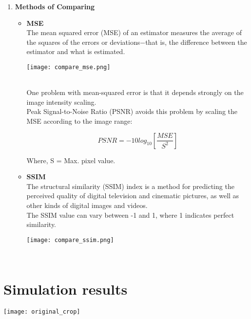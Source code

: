 \documentclass[journal]{IEEEtran}
\begin{document}
\begin{enumerate}
    \item \textbf{Methods of Comparing}\\
    \begin{itemize}
        \item \textbf{MSE}\\
        The mean squared error (MSE) of an estimator measures the average of the squares of the errors or deviations$-$that is, the difference between the estimator and what is estimated.\\
        
        \begin{minipage}{\linewidth}
    		\centering
    		\texttt{[image: compare\_mse.png]}
    	\end{minipage} \\
        
        One problem with mean-squared error is that it depends strongly on the image intensity scaling.\\
        Peak Signal-to-Noise Ratio (PSNR) avoids this problem by scaling the MSE according to the image range:
        
            $$PSNR = -10 log_{10}[\frac{MSE}{S^2}]$$
        
        Where, S = Max. pixel value.\\
        
        \item \textbf{SSIM}\\
        The structural similarity (SSIM) index is a method for predicting the perceived quality of digital television and cinematic pictures, as well as other kinds of digital images and videos. \\
        The SSIM value can vary between -1 and 1, where 1 indicates perfect similarity.\\
        
        \begin{minipage}{\linewidth}
    		\centering
    		\texttt{[image: compare\_ssim.png]}
    	\end{minipage} \\
    \end{itemize}
    
	    
	\end{enumerate}
	
	\section{\textbf{Simulation results}}
	    \begin{minipage}{\linewidth}
    		\centering
    		\texttt{[image: original\_crop]}
	    \end{minipage} 
	    
\end{document}
